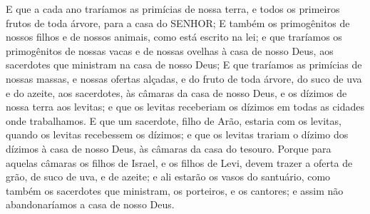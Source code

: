 {{  E que a cada ano traríamos as primícias de nossa terra, e todos os primeiros frutos de toda árvore, para a casa do SENHOR;
  E também os primogênitos de nossos filhos e de nossos animais, como está escrito na lei; e que traríamos os primogênitos de nossas vacas e de nossas ovelhas à casa de nosso Deus, aos sacerdotes que ministram na casa de nosso Deus; %
  E que traríamos as primícias de nossas massas, e nossas ofertas alçadas, e do fruto de toda árvore, do suco de uva e do azeite, aos sacerdotes, às câmaras da casa de nosso Deus, e os dízimos de nossa terra aos levitas; e que os levitas receberiam os dízimos em todas as cidades onde trabalhamos.
  E que um sacerdote, filho de Arão, estaria com os levitas, quando os levitas recebessem os dízimos; e que os levitas trariam o dízimo dos dízimos à casa de nosso Deus, às câmaras da casa do tesouro.
  Porque para aquelas câmaras os filhos de Israel, e os filhos de Levi, devem trazer a oferta de grão, de suco de uva, e de azeite; e ali estarão os vasos do santuário, como também os sacerdotes que ministram, os porteiros, e os cantores; e assim não abandonaríamos a casa de nosso Deus}.
\par }

